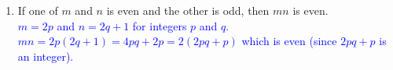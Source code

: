 \documentclass[13.5pt]{article}
\begin{document}
\begin{enumerate}
\begin{enumerate}
\item {If one of \(m\) and \(n\) is even and the other is odd, then \(mn\) is even.}\\
\textcolor{blue} {\(m=2p\) and \(n=2q+1\) for integers \(p\) and \(q\).}\\
\textcolor{blue} {\(mn=2p(2q+1)=4pq+2p=2(2pq+p)\) which is even (since \(2pq+p\) is an integer).} 



\end{enumerate}



\end{enumerate}
\end{document}
